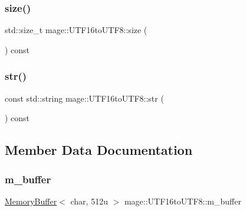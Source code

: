 \subsubsection{\texorpdfstring{size()}{size()}}
{\footnotesize\ttfamily std\+::size\+\_\+t mage\+::\+U\+T\+F16to\+U\+T\+F8\+::size (\begin{DoxyParamCaption}{ }\end{DoxyParamCaption}) const\hspace{0.3cm}{\ttfamily [noexcept]}}

\mbox{\label{classmage_1_1_u_t_f16to_u_t_f8_a907c9aac369d7c9f66917aa53a5dd4b9}} 
\subsubsection{\texorpdfstring{str()}{str()}}
{\footnotesize\ttfamily const std\+::string mage\+::\+U\+T\+F16to\+U\+T\+F8\+::str (\begin{DoxyParamCaption}{ }\end{DoxyParamCaption}) const}



\subsection{Member Data Documentation}
\mbox{\label{classmage_1_1_u_t_f16to_u_t_f8_ae4975c52c3be2f500b7da56684d86bfd}} 
\subsubsection{\texorpdfstring{m\+\_\+buffer}{m\_buffer}}
{\footnotesize\ttfamily \mbox{\hyperlink{classmage_1_1_memory_buffer}{Memory\+Buffer}}$<$ char, 512u $>$ mage\+::\+U\+T\+F16to\+U\+T\+F8\+::m\+\_\+buffer\hspace{0.3cm}{\ttfamily [private]}}

